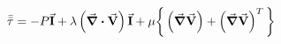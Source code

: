 \begin{equation}
  \bar{\bar{\tau}} = -P\va{I} + \lambda\left(\div{\va{V}}\right)\va{I}  
+ \mu\bigg\{\left(\grad{\va{V}}\right) 
  + \left(\grad\va{V}\right)^T \bigg\}
\end{equation}

